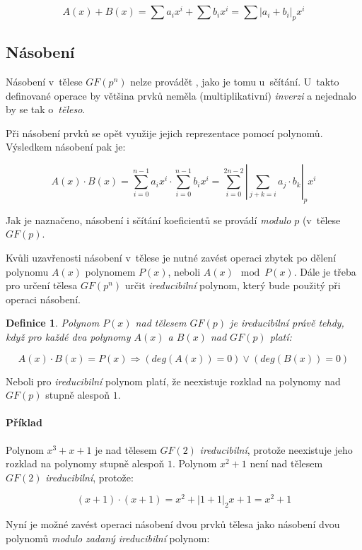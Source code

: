 \documentclass[thesis=M,czech,hidelinks]{FITthesis}[2012/06/26]
\newcommand{\0}{{\textcolor[gray]{0.80}{0}}}
\newtheorem{definice}{Definice}
\begin{document}
$$
    A(x) + B(x) = \sum a_i x^i + \sum b_i x^i =
    \sum \left|a_i + b_i\right|_p x^i
$$


\subsection{Násobení}

Násobení v~tělese $GF(p^n)$ nelze provádět , jako je tomu
u~sčítání. U~takto definované operace by většina prvků neměla (multiplikativní)
\emph{inverzi} a nejednalo by se tak o~\emph{těleso}.

Při násobení prvků se opět využije jejich reprezentace pomocí polynomů.
Výsledkem násobení pak je:

$$
    A(x) \cdot B(x) = \sum_{i=0}^{n-1} a_i x^i \cdot \sum_{i=0}^{n-1} b_i x^i =
    \sum_{i=0}^{2n-2} \left|\sum_{j+k=i} a_j \cdot b_k\right|_p x^i
$$

Jak je naznačeno, násobení i sčítání koeficientů se provádí \emph{modulo} $p$
(v~tělese $GF(p)$.

Kvůli uzavřenosti násobení v~tělese je nutné zavést operaci zbytek po dělení
polynomu $A(x)$ polynomem $P(x)$, neboli $A(x) \mod P(x)$. Dále je třeba pro
určení tělesa $GF(p^n)$ určit \emph{ireducibilní} polynom, který bude použitý
při operaci násobení.

\begin{definice}
    Polynom $P(x)$ nad tělesem $GF(p)$ je \emph{ireducibilní} právě tehdy, když
    pro každé dva polynomy $A(x)$ a $B(x)$ nad $GF(p)$ platí:

    $$
        A(x) \cdot B(x) = P(x) \Rightarrow \left( deg(A(x)) = 0 \right) \lor
        \left( deg(B(x)) = 0 \right)
    $$
\end{definice}

Neboli pro \emph{ireducibilní} polynom platí, že neexistuje rozklad na polynomy
nad $GF(p)$ stupně alespoň $1$.

\paragraph{Příklad} Polynom $x^3+x+1$ je nad tělesem $GF(2)$
\emph{ireducibilní}, protože neexistuje jeho rozklad na polynomy stupně alespoň
$1$. Polynom $x^2+1$ není nad tělesem $GF(2)$ \emph{ireducibilní}, protože:

$$ (x+1)\cdot(x+1) = x^2 + \left|1+1\right|_2x + 1 = x^2+1 $$

Nyní je možné zavést operaci násobení dvou prvků tělesa jako násobení dvou
polynomů \emph{modulo} \emph{zadaný ireducibilní} polynom:
\end{document}
